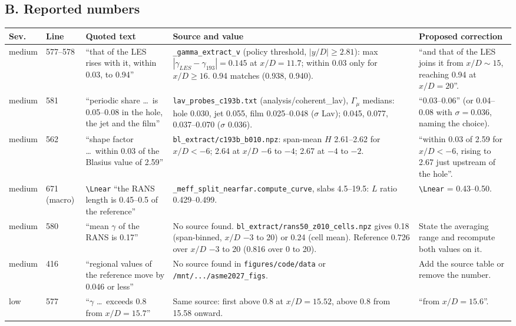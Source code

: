 \documentclass[10pt,a4paper]{article}
\begin{document}
\subsection*{B. Reported numbers}
{\footnotesize
\begin{longtable}{@{}P{9mm} P{9mm} P{39mm} P{53mm} P{47mm}@{}}
\toprule
Sev. & Line & Quoted text & Source and value & Proposed correction \\ \midrule\endhead
medium & 577--578 & ``that of the LES rises with it, within 0.03, to 0.94''
 & \texttt{\_gamma\_extract\_v} (policy threshold, $|y/D|\ge2.81$): max $|\gamma_{LES}-\gamma_{193}|=0.145$ at
   $x/D=11.7$; within 0.03 only for $x/D\ge16$. 0.94 matches (0.938, 0.940).
 & ``and that of the LES joins it from $x/D\sim15$, reaching 0.94 at $x/D=20$''. \\
medium & 581 & ``periodic share \dots\ is 0.05--0.08 in the hole, the jet and the film''
 & \texttt{lav\_probes\_c193b.txt} (analysis/coherent\_lav), $\Gamma_\mu$ medians: hole 0.030, jet 0.055, film
   0.025--0.048 ($\sigma$ Lav); 0.045, 0.077, 0.037--0.070 ($\sigma$ 0.036).
 & ``0.03--0.06'' (or 0.04--0.08 with $\sigma=0.036$, naming the choice). \\
medium & 562 & ``shape factor \dots\ within 0.03 of the Blasius value of 2.59''
 & \texttt{bl\_extract/c193b\_b010.npz}: span-mean $H$ 2.61--2.62 for $x/D<-6$; 2.64 at $x/D$ $-6$ to $-4$; 2.67 at
   $-4$ to $-2$.
 & ``within 0.03 of 2.59 for $x/D<-6$, rising to 2.67 just upstream of the hole''. \\
medium & 671 (macro) & \verb|\Lnear| ``the RANS length is 0.45--0.5 of the reference''
 & \texttt{\_meff\_split\_nearfar.compute\_curve}, slabs 4.5--19.5: $L$ ratio 0.429--0.499.
 & \verb|\Lnear| = 0.43--0.50. \\
medium & 580 & ``mean $\gamma$ of the RANS is 0.17''
 & No source found. \texttt{bl\_extract/rans50\_z010\_cells.npz} gives 0.18 (span-binned, $x/D$ $-3$ to 20) or 0.24
   (cell mean). Reference 0.726 over $x/D$ $-3$ to 20 (0.816 over 0 to 20).
 & State the averaging range and recompute both values on it. \\
medium & 416 & ``regional values of the reference move by 0.046 or less''
 & No source found in \texttt{figures/code/data} or \texttt{/mnt/.../asme2027\_figs}.
 & Add the source table or remove the number. \\
low & 577 & ``$\gamma$ \dots\ exceeds 0.8 from $x/D=15.7$''
 & Same source: first above 0.8 at $x/D=15.52$, above 0.8 from 15.58 onward.
 & ``from $x/D=15.6$''. \\

\end{longtable}}
\end{document}
